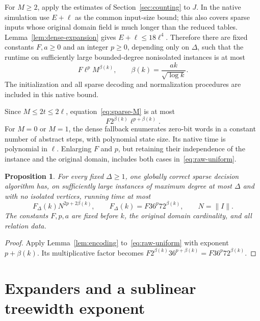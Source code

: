 \documentclass[11pt,reqno]{amsart}
\numberwithin{equation}{section}
\newtheorem{proposition}[theorem]{Proposition}
\theoremstyle{definition}
\theoremstyle{remark}
\begin{document}
For $M\ge2$, apply the estimates of Section~\ref{sec:counting} to $J$. In the native simulation use $E+\ell$ as the common input-size bound; this also covers sparse inputs whose original domain field is much longer than the reduced tables. Lemma~\ref{lem:dense-expansion} gives $E+\ell\le18\ell^4$. Therefore there are fixed constants $F,a\ge0$ and an integer $p\ge0$, depending only on $\Delta$, such that the runtime on sufficiently large bounded-degree nonisolated instances is at most
\begin{equation}\label{eq:sparse-M}
 F\ell^p M^{\beta(k)},\qquad
 \beta(k)=\frac{ak}{\sqrt{\log k}}.
\end{equation}
The initialization and all sparse decoding and normalization procedures are included in this native bound.

Since $M\le2t\le2\ell$, equation~\eqref{eq:sparse-M} is at most
\begin{equation}\label{eq:raw-uniform}
 F2^{\beta(k)}\ell^{p+\beta(k)}.
\end{equation}
For $M=0$ or $M=1$, the dense fallback enumerates zero-bit words in a constant number of abstract steps, with polynomial state size. Its native time is polynomial in $\ell$. Enlarging $F$ and $p$, but retaining their independence of the instance and the original domain, includes both cases in~\eqref{eq:raw-uniform}.

\begin{proposition}\label{prop:sparse-bound}
For every fixed $\Delta\ge1$, one globally correct sparse decision algorithm has, on sufficiently large instances of maximum degree at most $\Delta$ and with no isolated vertices, running time at most
\begin{equation}\label{eq:ordinary-bound}
 F_\Delta(k)N^{2p+2\beta(k)},\qquad
 F_\Delta(k)=F36^p72^{\beta(k)},\qquad N=\lVert I\rVert.
\end{equation}
The constants $F,p,a$ are fixed before $k$, the original domain cardinality, and all relation data.
\end{proposition}
\begin{proof}
Apply Lemma~\ref{lem:encoding} to~\eqref{eq:raw-uniform} with exponent $p+\beta(k)$. Its multiplicative factor becomes $F2^{\beta(k)}36^{p+\beta(k)}=F36^p72^{\beta(k)}$.
\end{proof}

\section{Expanders and a sublinear treewidth exponent}\label{sec:graphs}
\end{document}
